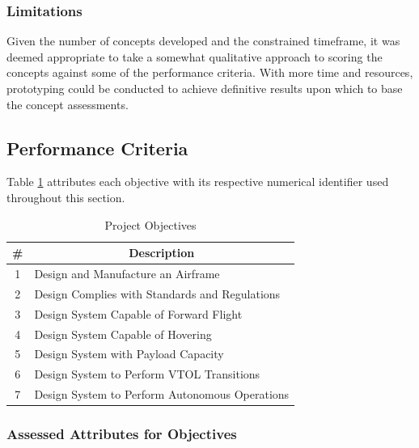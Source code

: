 \subsubsection{Limitations}

Given the number of concepts developed and the constrained timeframe, it was deemed appropriate to take a somewhat qualitative approach to scoring the concepts against some of the performance criteria. With more time and resources, prototyping could be conducted to achieve definitive results upon which to base the concept assessments.

\subsection{Performance Criteria}\label{perfcrit}


Table \ref{tab:objectives} attributes each objective with its respective numerical identifier used throughout this section.

\begin{table}[H]
\caption{Project Objectives}
\label{tab:objectives}
\centering
\begin{tabular}{|c|p{10cm}|}
\hline
             \#                       & \multicolumn{1}{c|}{\textbf{Description}} \\\hline
1 & Design and Manufacture an Airframe                                    \\
2 & Design Complies with Standards and Regulations                                     \\
3 & Design System Capable of Forward Flight                                                \\
4 & Design System Capable of Hovering                                                \\
5 & Design System with Payload Capacity                                                                   \\
6 & Design System to Perform VTOL Transitions                                                               \\
7 & Design System to Perform Autonomous Operations                                                              \\\hline
\end{tabular}
\end{table}



\subsubsection{Assessed Attributes for Objectives}

